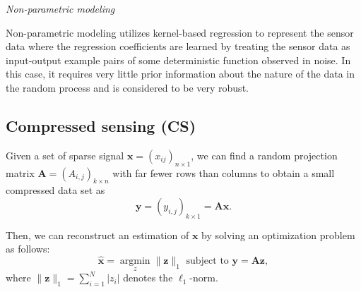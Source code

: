 \emph{\textcolor[rgb]{1,0,0}{Non-parametric modeling}}

Non-parametric modeling utilizes kernel-based regression to represent the sensor data where the regression coefficients are learned by treating the sensor data as input-output example pairs of some deterministic function observed in noise. In this case, it requires very little prior information about the nature of the data in the random process and is considered to be very robust. 

\subsection{Compressed sensing (CS)}

Given a set of sparse signal $\mathbf{x} = (x_{ij})_{n \times 1}$, we can find a random projection matrix $\mathbf{A} = (A_{i,j})_{k \times n}$ with far fewer rows than columns to obtain a small compressed data set as 
\begin{equation}
    \mathbf{y} = (y_{i,j})_{k \times 1} = \mathbf{Ax}.
    \label{eq2.3.33}
\end{equation}

Then, we can reconstruct an estimation of $\mathbf{x}$ by solving an optimization problem as follows:
\begin{equation*}
    \hat{\mathbf{x}} = \mathop{\mathrm{argmin}}\limits_z \|\mathbf{z}\|_1 \text{ subject to  }\mathbf{y} = \mathbf{Az},
\end{equation*}
where $\|\mathbf{z}\|_1 = \sum_{i=1}^{N}\left|z_i\right|$ denotes the $\ell_1$-norm.


